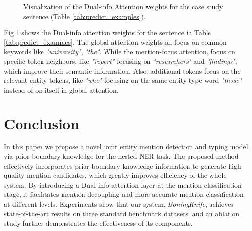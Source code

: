 \documentclass[11pt,a4paper]{article}
\begin{document}
\label{sec:attention_weight}

\begin{figure}[t]
    \centering
    \centering
    \caption{Visualization of the Dual-info Attention weights for the case study sentence (Table \ref{tab:predict_examples}).}
    \label{fig:atten_weight}
\end{figure}

Fig \ref{fig:atten_weight} shows the Dual-info attention weights for the sentence in Table \ref{tab:predict_examples}.
The global attention weights all focus on common keywords like \textit{"university"}, \textit{"the"}. While the mention-focus attention, focus on specific token neighbors, like \textit{"report"} focusing on \textit{"researchers"} and \textit{"findings"}, which improve their semantic information. Also, additional tokens focus on the relevant entity tokens, like \textit{"who"} focusing on the same entity type word \textit{"those"} instead of on itself in global attention.
 
\section{Conclusion}
\label{sec:Conclusion}

In this paper we propose a novel joint entity mention detection and typing model via prior boundary knowledge for the nested NER task. 
The proposed method effectively incorporates prior boundary knowledge information to generate high quality mention candidates, which greatly improves efficiency of the whole system. By introducing a Dual-info attention layer at the mention classification stage, it facilitates mention decoupling and more accurate mention classification at different levels.
Experiments show that our system, \textit{BoningKnife}, achieves state-of-the-art results on three standard benchmark datasets; and an ablation study further demonstrates the effectiveness of its components. 


\end{document}
